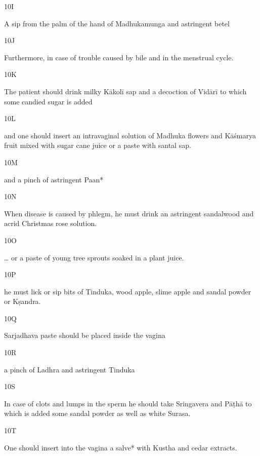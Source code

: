 \begin{translation}
\begin{tt}
\item[10I]

A sip from the palm of the hand of Madhukamunga and astringent betel
  
\item[10J]

Furthermore, in case of trouble caused by bile and in the menstrual 
  cycle.
  
\item[10K]

The patient should drink milky Kākolī sap and a decoction of Vidārī to 
  which some candied sugar is added
  
\item[10L]

and one should insert an intravaginal solution of Madhuka flowers and 
  Kāśmarya fruit mixed with sugar cane juice or a paste with santal sap.
  
\item[10M]

and a pinch of astringent Paan*
  
  
\item[10N]

When disease is caused by phlegm, he must drink an astringent 
  sandalwood and acrid Christmas rose solution.
  
\item[10O]

… or a paste of young tree sprouts soaked in a plant juice.
  
\item[10P]

he must lick or sip bits of Tinduka, wood apple, slime apple and sandal 
  powder or Kṣandra.
  
\item[10Q]

 Sarjadhava paste should be placed inside the vagina
  
\item[10R]

a pinch of Ladhra and astringent Tinduka
  
\item[10S]

In case of clots and lumps in the sperm he should take Sringavera and 
  Pāṭhā to which is added some sandal powder as well as white Surasa.
  
\item[10T]

One should insert into the vagina a salve* with Kustha and cedar 
  extracts.
  

\end{tt}
\end{translation}
